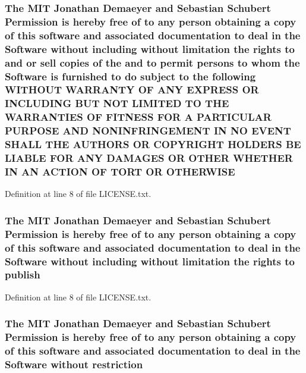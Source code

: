\subsubsection[{\texorpdfstring{O\+T\+H\+E\+R\+W\+I\+SE}{OTHERWISE}}]{\setlength{\rightskip}{0pt plus 5cm}The M\+IT Jonathan Demaeyer and Sebastian Schubert Permission is hereby free of to any person obtaining a {\bf copy} of this software and associated documentation to deal in the {\bf Software} without including without limitation the rights to and or sell copies of the and to permit persons to whom the {\bf Software} is furnished to do subject to the following W\+I\+T\+H\+O\+UT W\+A\+R\+R\+A\+N\+TY OF A\+NY E\+X\+P\+R\+E\+SS OR I\+N\+C\+L\+U\+D\+I\+NG B\+UT N\+OT L\+I\+M\+I\+T\+ED TO T\+HE W\+A\+R\+R\+A\+N\+T\+I\+ES OF F\+I\+T\+N\+E\+SS F\+OR A P\+A\+R\+T\+I\+C\+U\+L\+AR P\+U\+R\+P\+O\+SE A\+ND N\+O\+N\+I\+N\+F\+R\+I\+N\+G\+E\+M\+E\+NT IN NO E\+V\+E\+NT S\+H\+A\+LL T\+HE A\+U\+T\+H\+O\+RS OR C\+O\+P\+Y\+R\+I\+G\+HT H\+O\+L\+D\+E\+RS BE L\+I\+A\+B\+LE F\+OR A\+NY D\+A\+M\+A\+G\+ES OR O\+T\+H\+ER W\+H\+E\+T\+H\+ER IN AN A\+C\+T\+I\+ON OF T\+O\+RT OR O\+T\+H\+E\+R\+W\+I\+SE}\hypertarget{LICENSE_8txt_a2d09f8d7fb0c021348af586f6580b73f}{}\label{LICENSE_8txt_a2d09f8d7fb0c021348af586f6580b73f}


Definition at line 8 of file L\+I\+C\+E\+N\+S\+E.\+txt.

\subsubsection[{\texorpdfstring{publish}{publish}}]{\setlength{\rightskip}{0pt plus 5cm}The M\+IT Jonathan Demaeyer and Sebastian Schubert Permission is hereby free of to any person obtaining a {\bf copy} of this software and associated documentation to deal in the {\bf Software} without including without limitation the rights to publish}\hypertarget{LICENSE_8txt_afb7821403b8db816807ae41851a6e338}{}\label{LICENSE_8txt_afb7821403b8db816807ae41851a6e338}


Definition at line 8 of file L\+I\+C\+E\+N\+S\+E.\+txt.

\subsubsection[{\texorpdfstring{restriction}{restriction}}]{\setlength{\rightskip}{0pt plus 5cm}The M\+IT Jonathan Demaeyer and Sebastian Schubert Permission is hereby free of to any person obtaining a {\bf copy} of this software and associated documentation to deal in the {\bf Software} without restriction}\hypertarget{LICENSE_8txt_ac2af11c5ae84efcd63ec3aa6cc6c0ea4}{}\label{LICENSE_8txt_ac2af11c5ae84efcd63ec3aa6cc6c0ea4}


